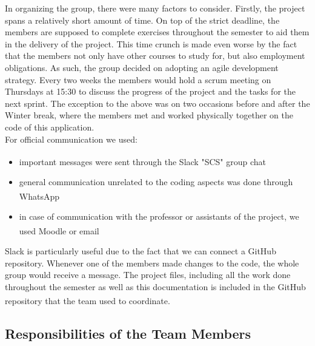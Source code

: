 \documentclass[hidelinks,conference,12pt]{IEEETran}
\begin{document}
In organizing the group, there were many factors to consider. Firstly, the project spans a relatively short amount of time. On top of the strict deadline, the members are supposed to complete exercises throughout the semester to aid them in the delivery of the project. This time crunch is made even worse by the fact that the members not only have other courses to study for, but also employment obligations. As such, the group decided on adopting an agile development strategy. Every two weeks the members would hold a scrum meeting on Thursdays at 15:30 to discuss the progress of the project and the tasks for the next sprint. The exception to the above was on two occasions before and after the Winter break, where the members met and worked physically together on the code of this application.\\
For official communication we used:
\begin{itemize}
	\item important messages were sent through the Slack\textsuperscript{\cite{slack}} "SCS" group chat
	\item general communication unrelated to the coding aspects was done through WhatsApp\textsuperscript{\cite{whatsapp}}
	\item in case of communication with the professor or assistants of the project, we used Moodle\textsuperscript{\cite{moodle}} or email
\end{itemize}
Slack is particularly useful due to the fact that we can connect a GitHub repository. Whenever one of the members made changes to the code, the whole group would receive a message. The project files, including all the work done throughout the semester as well as this documentation is included in the GitHub repository\textsuperscript{\cite{github}} that the team used to coordinate.

\subsection{Responsibilities of the Team Members}
\end{document}
